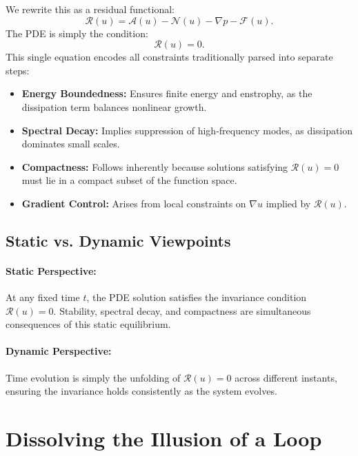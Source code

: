 We rewrite this as a residual functional:
\begin{equation}
\mathcal{R}(u) = \mathcal{A}(u) - \mathcal{N}(u) - \nabla p - \mathcal{F}(u).
\end{equation}
The PDE is simply the condition:
\begin{equation}
\mathcal{R}(u) = 0.
\end{equation}
This single equation encodes all constraints traditionally parsed into separate steps:
\begin{itemize}
    \item \textbf{Energy Boundedness:} Ensures finite energy and enstrophy, as the dissipation term balances nonlinear growth.
    \item \textbf{Spectral Decay:} Implies suppression of high-frequency modes, as dissipation dominates small scales.
    \item \textbf{Compactness:} Follows inherently because solutions satisfying \(\mathcal{R}(u) = 0\) must lie in a compact subset of the function space.
    \item \textbf{Gradient Control:} Arises from local constraints on \(\nabla u\) implied by \(\mathcal{R}(u)\).
\end{itemize}

\subsection{Static vs. Dynamic Viewpoints}
\paragraph{Static Perspective:} At any fixed time \(t\), the PDE solution satisfies the invariance condition \(\mathcal{R}(u) = 0\). Stability, spectral decay, and compactness are simultaneous consequences of this static equilibrium.

\paragraph{Dynamic Perspective:} Time evolution is simply the unfolding of \(\mathcal{R}(u) = 0\) across different instants, ensuring the invariance holds consistently as the system evolves.

\section{Dissolving the Illusion of a Loop}

